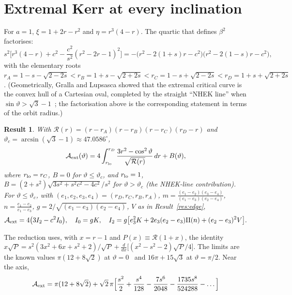 \documentclass[11pt,a4paper]{article}
\newtheorem{result}{Result}
\theoremstyle{remark}
\numberwithin{equation}{section}
\begin{document}
\section{Extremal Kerr at every inclination}\label{sec:ext}
For $a=1$, $\xi=1+2r-r^2$ and $\eta=r^3(4-r)$. The quartic that defines $\beta^2$ factorises:
\begin{equation}
s^2\Big[r^3(4-r)+c^2-\frac{c^2}{s^2}(r^2-2r-1)^2\Big]=-\big(r^2-2(1+s)r-c^2\big)\big(r^2-2(1-s)r-c^2\big),
\end{equation}
with the elementary roots
$r_A=1-s-\sqrt{2-2s}<r_B=1+s-\sqrt{2+2s}<r_C=1-s+\sqrt{2-2s}<r_D=1+s+\sqrt{2+2s}$.
(Geometrically, Gralla and Lupsasca showed that the extremal critical curve is the convex hull of a
Cartesian oval, completed by the straight ``NHEK line'' when $\sin\vartheta>\sqrt3-1$~\cite{GrallaLupsasca2020shape};
the factorisation above is the corresponding statement in terms of the orbit radius.)
\begin{result}\label{res:ext}
With $\mathcal R(r)=(r-r_A)(r-r_B)(r-r_C)(r_D-r)$ and $\vartheta_c=\arcsin(\sqrt3-1)\approx47.0586^\circ$,
\begin{equation}
\mathcal A_{\rm ext}(\vartheta)=4\int_{r_{\rm lo}}^{r_D}\frac{3r^2-\cos^2\vartheta}{\sqrt{\mathcal R(r)}}\,dr+B(\vartheta),
\label{eq:extint}
\end{equation}
where $r_{\rm lo}=r_C$, $B=0$ for $\vartheta\le\vartheta_c$, and $r_{\rm lo}=1$,
$B=(2+s^2)\sqrt{3s^2+s^2c^2-4c^2}/s^2$ for $\vartheta>\vartheta_c$ (the NHEK-line contribution). For
$\vartheta\le\vartheta_c$, with $(e_1,e_2,e_3,e_4)=(r_D,r_C,r_B,r_A)$,
$m=\frac{(e_1-e_2)(e_3-e_4)}{(e_1-e_3)(e_2-e_4)}$,
$n=\frac{e_1-e_2}{e_1-e_3}$, $g=2/\sqrt{(e_1-e_3)(e_2-e_4)}$, $V$ as in
Result~\ref{res:edge},
\begin{equation}
\mathcal A_{\rm ext}=4\big(3I_2-c^2I_0\big),\quad I_0=gK,\quad
I_2=g\big[e_3^2K+2e_3(e_2-e_3)\Pi(n)+(e_2-e_3)^2V\big].
\end{equation}
\end{result}
The reduction uses, with $x=r-1$ and $P(x)\equiv\mathcal R(1+x)$, the identity $x\sqrt P=s^2(3x^2+6x+s^2+2)/\sqrt P+\frac{d}{dx}\big[(x^2-s^2-2)\sqrt P/4\big]$.
The limits are the known values $\pi(12+8\sqrt2)$ at $\vartheta=0$~\cite{FengLu2020} and $16\pi+15\sqrt3$ at
$\vartheta=\pi/2$. Near the axis,
\begin{equation}
\mathcal A_{\rm ext}=\pi(12+8\sqrt2)+\sqrt2\,\pi\Big[\frac{s^2}{2}+\frac{s^4}{128}-\frac{7s^6}{2048}-\frac{1735s^8}{524288}-\dots\Big]
\end{equation}
\end{document}
